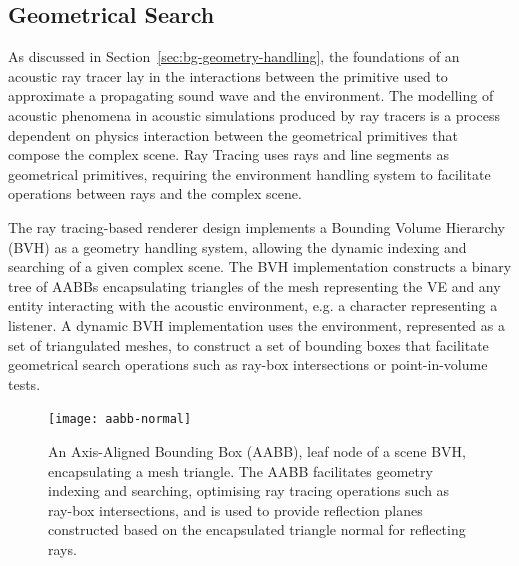 \subsection{Geometrical Search}
As discussed in Section~\ref{sec:bg-geometry-handling}, the foundations of an acoustic ray tracer lay in the interactions between the primitive used to approximate a propagating sound wave and the environment. The modelling of acoustic phenomena in acoustic simulations produced by ray tracers is a process dependent on physics interaction between the geometrical primitives that compose the complex scene. Ray Tracing uses rays and line segments as geometrical primitives, requiring the environment handling system to facilitate operations between rays and the complex scene.\par
The ray tracing-based renderer design implements a Bounding Volume Hierarchy (BVH) as a geometry handling system, allowing the dynamic indexing and searching of a given complex scene. The BVH implementation constructs a binary tree of AABBs encapsulating triangles of the mesh representing the VE and any entity interacting with the acoustic environment, e.g. a character representing a listener. 
A dynamic BVH implementation uses the environment, represented as a set of triangulated meshes, to construct a set of bounding boxes that facilitate geometrical search operations such as ray-box intersections or point-in-volume tests. \par
\begin{figure}[h]
    \centering
    \texttt{[image: aabb-normal]}
    \caption{An Axis-Aligned Bounding Box (AABB), leaf node of a scene BVH, encapsulating a mesh triangle. The AABB facilitates geometry indexing and searching, optimising ray tracing operations such as ray-box intersections, and is used to provide reflection planes constructed based on the encapsulated triangle normal for reflecting rays.}
    \label{fig:aabb-normal}
\end{figure}

